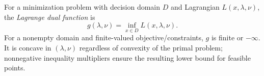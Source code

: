 
For a minimization problem with decision domain $D$ and Lagrangian $L(x,\lambda,\nu)$, the \emph{Lagrange dual function} is
\[
g(\lambda,\nu)=\inf_{x\in D}L(x,\lambda,\nu).
\]
For a nonempty domain and finite-valued objective/constraints, $g$ is finite or $-\infty$. It is concave in $(\lambda,\nu)$ regardless of convexity of the primal problem; nonnegative inequality multipliers ensure the resulting lower bound for feasible points.

